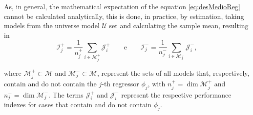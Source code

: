 As, in general, the mathematical expectation of the equation \eqref{eq:desMedioReg} cannot be calculated analytically, this is done, in practice, by estimation, taking models from the universe model $\mathscr{U}$ set and calculating the sample mean, resulting in
\begin{equation}
   \mathcal{I}^+_j = \frac{1}{n_j^+}\sum_{i \in \mathscr{M}_j^+}\mathcal{J}^{+}_{i} \qquad \text{e} \qquad \mathcal{I}^-_j = \frac{1}{n_j^-}\sum_{i \in \mathscr{M}_j^-}\mathcal{J}^{-}_{i},
\label{eq:avgRefPerf}
\end{equation}


where $ \mathscr{M}^+_j \subset \mathscr{M}$ and $ \mathscr{M}^-_j \subset \mathscr{M}$, represent the sets of all models that, respectively, contain and do not contain the $j$-th regressor $\phi_j$, with $n_j^+ = \dim \mathscr{M}^+_j $ and $n_j^- = \dim \mathscr{M}^-_j $. The terms $\mathcal{J}^{+}_{i}$ and $\mathcal{J}^{-}_{i}$ represent the respective performance indexes for cases that contain and do not contain $\phi_j$.



